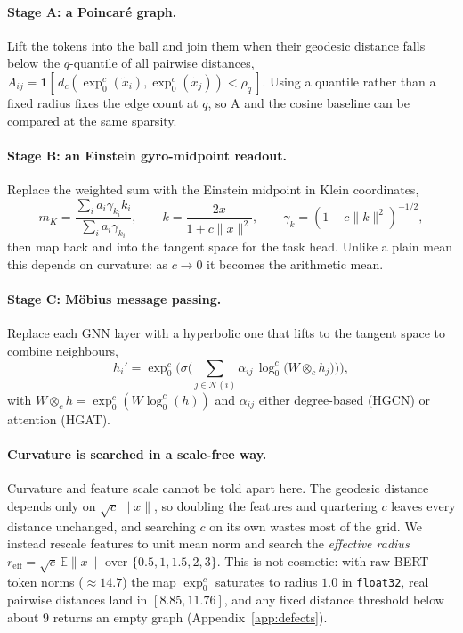 \documentclass{article}
\begin{document}
\paragraph{Stage A: a Poincar\'e graph.} Lift the tokens into the ball and join
them when their geodesic distance falls below the $q$-quantile of all pairwise
distances,
$A_{ij} = \mathbf{1}[\,d_c(\exp^c_0(\tilde{x}_i), \exp^c_0(\tilde{x}_j)) < \rho_q\,]$.
Using a quantile rather than a fixed radius fixes the edge count at $q$, so A
and the cosine baseline can be compared at the same sparsity.

\paragraph{Stage B: an Einstein gyro-midpoint readout.} Replace the weighted
sum with the Einstein midpoint in Klein coordinates,
\begin{equation}
m_K = \frac{\sum_i a_i \gamma_{k_i} k_i}{\sum_i a_i \gamma_{k_i}},
\qquad k = \frac{2x}{1 + c\|x\|^2},
\qquad \gamma_k = (1 - c\|k\|^2)^{-1/2},
\label{eq:midpoint}
\end{equation}
then map back and into the tangent space for the task head. Unlike a plain mean
this depends on curvature: as $c \rightarrow 0$ it becomes the arithmetic mean.

\paragraph{Stage C: M\"obius message passing.} Replace each GNN layer with a
hyperbolic one that lifts to the tangent space to combine neighbours,
\begin{equation}
h_i' = \exp^c_0\!\Big(\sigma\Big(\textstyle\sum_{j \in \mathcal{N}(i)}
       \alpha_{ij}\, \log^c_0\big(W \otimes_c h_j\big)\Big)\Big),
\end{equation}
with $W \otimes_c h = \exp^c_0(W \log^c_0(h))$ and $\alpha_{ij}$ either
degree-based (HGCN) or attention (HGAT).

\paragraph{Curvature is searched in a scale-free way.} Curvature and feature
scale cannot be told apart here. The geodesic distance depends only on
$\sqrt{c}\,\|x\|$, so doubling the features and quartering $c$ leaves every
distance unchanged, and searching $c$ on its own wastes most of the grid. We
instead rescale features to unit mean norm and search the \emph{effective
radius} $r_{\text{eff}} = \sqrt{c}\,\mathbb{E}\|x\|$ over
$\{0.5, 1, 1.5, 2, 3\}$. This is not cosmetic: with raw BERT token norms
($\approx 14.7$) the map $\exp^c_0$ saturates to radius $1.0$ in
\texttt{float32}, real pairwise distances land in $[8.85, 11.76]$, and any
fixed distance threshold below about $9$ returns an empty graph
(Appendix~\ref{app:defects}).
\end{document}
